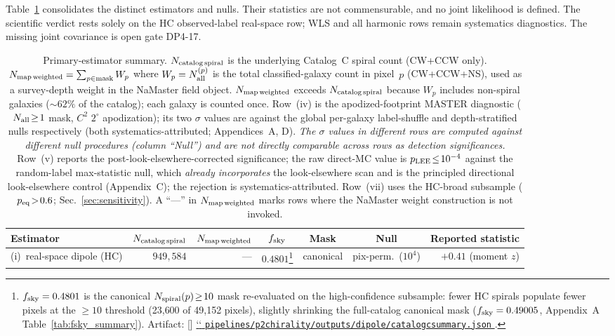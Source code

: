 \documentclass[aps,prd,twocolumn,superscriptaddress,preprintnumbers,nofootinbib,longbibliography,floatfix]{revtex4-2}
\makeatletter
\newcommand{\artbreak@us}{\discretionary{\char`\_}{}{\char`\_}}
\DeclareRobustCommand{\artifact}[1]{%
 \StrSubstitute{#1}{\_}{_}[\art@urlpath]%
 \href{https://github.com/Hubify-Projects/bigbounce/blob/main/\art@urlpath}{%
 \begingroup
 \let\_\artbreak@us
 \texttt{#1}%
 \endgroup
 }%
}
\makeatother
\begin{document}
Table~\ref{tab:headline_summary} consolidates the distinct estimators and nulls. Their statistics are not commensurable, and no joint likelihood is defined. The scientific verdict rests solely on the HC observed-label real-space row; WLS and all harmonic rows remain systematics diagnostics. The missing joint covariance is open gate DP4-17.

\begin{table}[t]
\caption{\label{tab:headline_summary}Primary-estimator summary. $N_{\rm catalog\,spiral}$ is the underlying Catalog~C spiral count (CW+CCW only). $N_{\rm map\,weighted} = \sum_{p\in\rm mask} W_p$ where $W_p = N_{\rm all}^{(p)}$ is the total classified-galaxy count in pixel~$p$ (CW+CCW+NS), used as a survey-depth weight in the NaMaster field object. $N_{\rm map\,weighted}$ exceeds $N_{\rm catalog\,spiral}$ because $W_p$ includes non-spiral galaxies (${\sim}62\%$ of the catalog); each galaxy is counted once. Row~(iv) is the apodized-footprint MASTER diagnostic ($N_{\rm all}\!\geq\!1$ mask, $C^2$ $2^\circ$ apodization); its two $\sigma$ values are against the global per-galaxy label-shuffle and depth-stratified nulls respectively (both systematics-attributed; Appendices~A, D). \emph{The $\sigma$ values in different rows are computed against different null procedures (column ``Null'') and are not directly comparable across rows as detection significances.} Row~(v) reports the post-look-elsewhere-corrected significance; the raw direct-MC value is $p_{\rm LEE}\!\le\!10^{-4}$ against the random-label max-statistic null, which \emph{already incorporates} the look-elsewhere scan and is the principled directional look-elsewhere control (Appendix~C); the rejection is systematics-attributed. Row~(vii) uses the HC-broad subsample ($p_{\rm eq}\!>\!0.6$; Sec.~\ref{sec:sensitivity}). A ``---'' in $N_{\rm map\,weighted}$ marks rows where the NaMaster weight construction is not invoked.}
\begin{ruledtabular}
\begin{tabular}{lrrcccr}
\textbf{Estimator} & $N_{\rm catalog\,spiral}$ & $N_{\rm map\,weighted}$ & $f_{\rm sky}$ & \textbf{Mask} & \textbf{Null} & \textbf{Reported statistic} \\
\hline
(i)~real-space dipole (HC) & $949{,}584$ & --- & $0.4801$\footnote{$f_{\rm sky}=0.4801$ is the canonical $N_{\rm spiral}(p)\!\ge\!10$ mask re-evaluated on the high-confidence subsample: fewer HC spirals populate fewer pixels at the $\ge\!10$ threshold (23{,}600 of 49{,}152 pixels), slightly shrinking the full-catalog canonical mask ($f_{\rm sky}=0.49005$, Appendix~A Table~\ref{tab:fsky_summary}). Artifact: \artifact{pipelines/p2\_chirality/outputs/dipole/catalog\_c\_summary.json}.} & canonical & pix-perm.\ ($10^4$) & $+0.41$ (moment $z$) \\

\end{tabular}
\end{ruledtabular}
\end{table}
\end{document}
